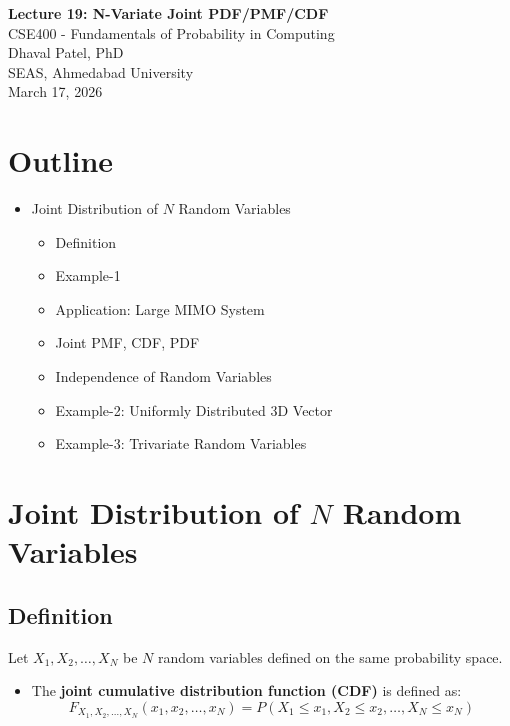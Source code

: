 \documentclass[11pt]{article}
\begin{document}
\begin{center}
    {\LARGE \textbf{Lecture 19: N-Variate Joint PDF/PMF/CDF}}\\[0.5em]
    {\large CSE400 - Fundamentals of Probability in Computing}\\[0.5em]
    {\normalsize Dhaval Patel, PhD}\\
    {\normalsize SEAS, Ahmedabad University}\\
    {\normalsize March 17, 2026}
\end{center}

\vspace{1em}

\section*{Outline}
\begin{itemize}
    \item Joint Distribution of $N$ Random Variables
    \begin{itemize}
        \item Definition
        \item Example-1
        \item Application: Large MIMO System
        \item Joint PMF, CDF, PDF
        \item Independence of Random Variables
        \item Example-2: Uniformly Distributed 3D Vector
        \item Example-3: Trivariate Random Variables
    \end{itemize}
\end{itemize}

\section{Joint Distribution of $N$ Random Variables}

\subsection{Definition}

Let $X_1, X_2, \dots, X_N$ be $N$ random variables defined on the same probability space.

\begin{itemize}
    \item The \textbf{joint cumulative distribution function (CDF)} is defined as:
    \[
    F_{X_1, X_2, \dots, X_N}(x_1, x_2, \dots, x_N)
    = P(X_1 \le x_1, X_2 \le x_2, \dots, X_N \le x_N)
    \]
\end{itemize}
\end{document}
